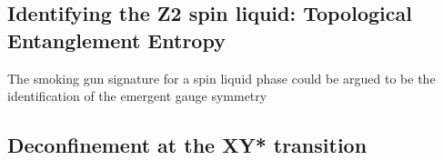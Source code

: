 \documentclass[aps,prb,groupedaddress,twocolumn]{revtex4}
\begin{document}



\subsection{Identifying the Z2 spin liquid: Topological Entanglement Entropy}

The smoking gun signature for a spin liquid phase could be argued to be the identification of the emergent gauge symmetry

\subsection{Deconfinement at the XY* transition}


\end{document}
